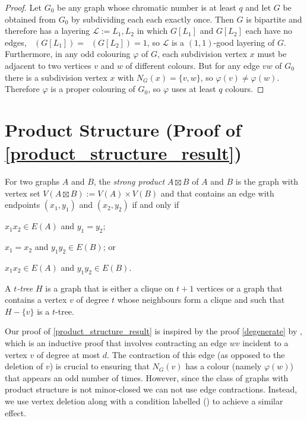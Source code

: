 \documentclass{patmorin}
\DeclareMathOperator{\odd}{\chi_o}
\begin{document}
\begin{proof}
  Let $G_0$ be any graph whose chromatic number is at least $q$ and let $G$ be obtained from $G_0$ by subdividing each each exactly once.  Then $G$ is bipartite and therefore has a layering $\mathcal{L}:=L_1,L_2$ in which $G[L_1]$ and $G[L_2]$ each have no edges, $\odd(G[L_1])=\odd(G[L_2])=1$, so $\mathcal{L}$ is a $(1,1)$-good layering of $G$.  Furthermore, in any odd colouring $\varphi$ of $G$, each subdivision vertex $x$ must be adjacent to two vertices $v$ and $w$ of different colours.  But for any edge $vw$ of $G_0$ there is a subdivision vertex $x$ with $N_G(x)=\{v,w\}$, so $\varphi(v)\neq\varphi(w)$.  Therefore $\varphi$ is a proper colouring of $G_0$, so $\varphi$ uses at least $q$ colours.
\end{proof}

\section{Product Structure (Proof of \cref{product_structure_result})}
\label{product_structure}

For two graphs $A$ and $B$, the \emph{strong product} $A\boxtimes B$ of $A$ and $B$ is the graph with vertex set $V(A\boxtimes B):=V(A)\times V(B)$ and that contains an edge with endpoints $(x_1,y_1)$ and $(x_2,y_2)$ if and only if
\begin{inparaenum}[(i)]
  \item $x_1x_2\in E(A)$ and $y_1=y_2$;
  \item $x_1=x_2$ and $y_1y_2\in E(B)$; or
  \item $x_1x_2\in E(A)$ and $y_1y_2\in E(B)$.
\end{inparaenum}
A \emph{$t$-tree} $H$ is a graph that is either a clique on $t+1$ vertices or a graph that contains a vertex $v$ of degree $t$ whose neighbours form a clique and such that $H-\{v\}$ is a $t$-tree.

Our proof of \cref{product_structure_result} is inspired by the proof \cref{degenerate} by \citet{cranston.lafferty.ea:note}, which is an inductive proof that involves contracting an edge $wv$ incident to a vertex $v$ of degree at most $d$.  The contraction of this edge (as opposed to the deletion of $v$) is crucial to ensuring that $N_G(v)$ has a colour (namely $\varphi(w)$) that appears an odd number of times.  However, since the class of graphs with product structure is not minor-closed we can not use edge contractions. Instead, we use vertex deletion along with a condition labelled () to achieve a similar effect.
\end{document}
